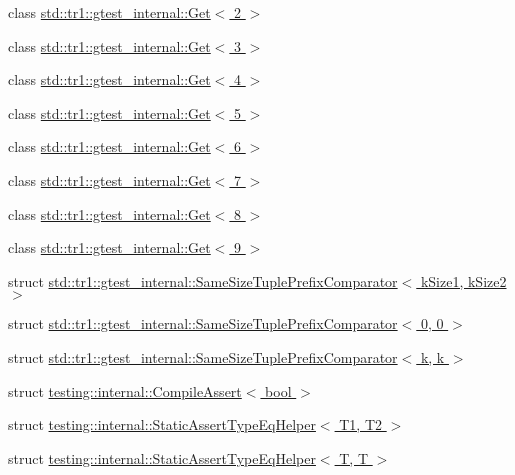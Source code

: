 \begin{DoxyCompactItemize}
\item 
class \hyperlink{classstd_1_1tr1_1_1gtest__internal_1_1_get_3_012_01_4}{std\-::tr1\-::gtest\-\_\-internal\-::\-Get$<$ 2 $>$}
\item 
class \hyperlink{classstd_1_1tr1_1_1gtest__internal_1_1_get_3_013_01_4}{std\-::tr1\-::gtest\-\_\-internal\-::\-Get$<$ 3 $>$}
\item 
class \hyperlink{classstd_1_1tr1_1_1gtest__internal_1_1_get_3_014_01_4}{std\-::tr1\-::gtest\-\_\-internal\-::\-Get$<$ 4 $>$}
\item 
class \hyperlink{classstd_1_1tr1_1_1gtest__internal_1_1_get_3_015_01_4}{std\-::tr1\-::gtest\-\_\-internal\-::\-Get$<$ 5 $>$}
\item 
class \hyperlink{classstd_1_1tr1_1_1gtest__internal_1_1_get_3_016_01_4}{std\-::tr1\-::gtest\-\_\-internal\-::\-Get$<$ 6 $>$}
\item 
class \hyperlink{classstd_1_1tr1_1_1gtest__internal_1_1_get_3_017_01_4}{std\-::tr1\-::gtest\-\_\-internal\-::\-Get$<$ 7 $>$}
\item 
class \hyperlink{classstd_1_1tr1_1_1gtest__internal_1_1_get_3_018_01_4}{std\-::tr1\-::gtest\-\_\-internal\-::\-Get$<$ 8 $>$}
\item 
class \hyperlink{classstd_1_1tr1_1_1gtest__internal_1_1_get_3_019_01_4}{std\-::tr1\-::gtest\-\_\-internal\-::\-Get$<$ 9 $>$}
\item 
struct \hyperlink{structstd_1_1tr1_1_1gtest__internal_1_1_same_size_tuple_prefix_comparator}{std\-::tr1\-::gtest\-\_\-internal\-::\-Same\-Size\-Tuple\-Prefix\-Comparator$<$ k\-Size1, k\-Size2 $>$}
\item 
struct \hyperlink{structstd_1_1tr1_1_1gtest__internal_1_1_same_size_tuple_prefix_comparator_3_010_00_010_01_4}{std\-::tr1\-::gtest\-\_\-internal\-::\-Same\-Size\-Tuple\-Prefix\-Comparator$<$ 0, 0 $>$}
\item 
struct \hyperlink{structstd_1_1tr1_1_1gtest__internal_1_1_same_size_tuple_prefix_comparator_3_01k_00_01k_01_4}{std\-::tr1\-::gtest\-\_\-internal\-::\-Same\-Size\-Tuple\-Prefix\-Comparator$<$ k, k $>$}
\item 
struct \hyperlink{structtesting_1_1internal_1_1_compile_assert}{testing\-::internal\-::\-Compile\-Assert$<$ bool $>$}
\item 
struct \hyperlink{structtesting_1_1internal_1_1_static_assert_type_eq_helper}{testing\-::internal\-::\-Static\-Assert\-Type\-Eq\-Helper$<$ T1, T2 $>$}
\item 
struct \hyperlink{structtesting_1_1internal_1_1_static_assert_type_eq_helper_3_01_t_00_01_t_01_4}{testing\-::internal\-::\-Static\-Assert\-Type\-Eq\-Helper$<$ T, T $>$}

\end{DoxyCompactItemize}
